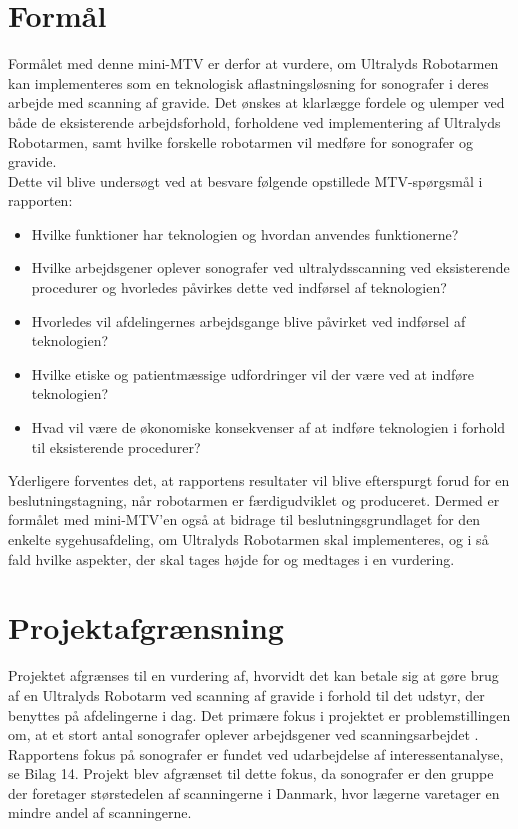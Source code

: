 
\section{Formål}
Formålet med denne mini-MTV er derfor at vurdere, om Ultralyds Robotarmen kan implementeres som en teknologisk aflastningsløsning for sonografer i deres arbejde med scanning af gravide. Det ønskes at klarlægge fordele og ulemper ved både de eksisterende arbejdsforhold, forholdene ved implementering af Ultralyds Robotarmen, samt hvilke forskelle robotarmen vil medføre for sonografer og gravide. \\
Dette vil blive undersøgt ved at besvare følgende opstillede MTV-spørgsmål i rapporten:
\begin{itemize}
\item Hvilke funktioner har teknologien og hvordan anvendes funktionerne?
\item Hvilke arbejdsgener oplever sonografer ved ultralydsscanning ved eksisterende procedurer og hvorledes påvirkes dette ved indførsel af teknologien?
\item Hvorledes vil afdelingernes arbejdsgange blive påvirket ved indførsel af teknologien?
\item Hvilke etiske og patientmæssige udfordringer vil der være ved at indføre teknologien?
\item Hvad vil være de økonomiske konsekvenser af at indføre teknologien i forhold til eksisterende procedurer?
\end{itemize}

Yderligere forventes det, at rapportens resultater vil blive efterspurgt forud for en beslutningstagning, når robotarmen er færdigudviklet og produceret. Dermed er formålet med mini-MTV’en også at bidrage til beslutningsgrundlaget for den enkelte sygehusafdeling, om Ultralyds Robotarmen skal implementeres, og i så fald hvilke aspekter, der skal tages højde for og medtages i en vurdering.

\section{Projektafgrænsning}
Projektet afgrænses til en vurdering af, hvorvidt det kan betale sig at gøre brug af en Ultralyds Robotarm ved scanning af gravide i forhold til det udstyr, der benyttes på afdelingerne i dag. Det primære fokus i projektet er problemstillingen om, at et stort antal sonografer oplever arbejdsgener ved scanningsarbejdet \cite{1}\cite{24}\cite{30}\cite{31}\cite{36}. \\
Rapportens fokus på sonografer er fundet ved udarbejdelse af interessentanalyse, se Bilag 14. Projekt blev afgrænset til dette fokus, da sonografer er den gruppe der foretager størstedelen af scanningerne i Danmark, hvor lægerne varetager en mindre andel af scanningerne.

